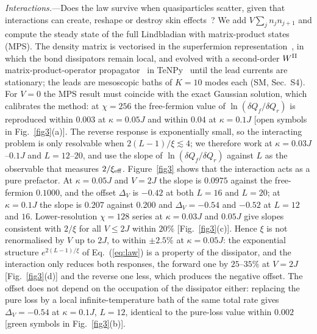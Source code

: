 \documentclass[reprint,aps,prl,superscriptaddress,nofootinbib,floatfix]{revtex4-2}
\newcommand{\dQ}{\delta Q}
\begin{document}
\textit{Interactions.}---Does the law survive when quasiparticles scatter, given that interactions can create, reshape or destroy skin effects~\cite{Brighi2024,Koh2026,Roccati2026}? We add $V\sum_j n_jn_{j+1}$ and compute the steady state of the full Lindbladian with matrix-product states (MPS). The density matrix is vectorised in the superfermion representation~\cite{Prosen2008,Dzhioev2011}, in which the bond dissipators remain local, and evolved with a second-order $W^{\rm II}$ matrix-product-operator propagator~\cite{Zaletel2015} in TeNPy~\cite{Hauschild2018} until the lead currents are stationary; the leads are mesoscopic baths of $K=10$ modes each (SM, Sec.~S4). For $V=0$ the MPS result must coincide with the exact Gaussian solution, which calibrates the method: at $\chi=256$ the free-fermion value of $\ln(\dQ_f/\dQ_r)$ is reproduced within $0.003$ at $\kappa=0.05J$ and within $0.04$ at $\kappa=0.1J$ [open symbols in Fig.~\ref{fig3}(a)].
The reverse response is exponentially small, so the interacting problem is only resolvable when $2(L-1)/\xi\lesssim4$; we therefore work at $\kappa=0.03J$--$0.1J$ and $L=12$--$20$, and use the slope of $\ln(\dQ_f/\dQ_r)$ against $L$ as the observable that measures $2/\xi_{\rm eff}$.
Figure~\ref{fig3} shows that the interaction acts as a pure prefactor. At $\kappa=0.05J$ and $V=2J$ the slope is $0.0975$ against the free-fermion $0.1000$, and the offset $\Delta_V$ is $-0.42$ at both $L=16$ and $L=20$; at $\kappa=0.1J$ the slope is $0.207$ against $0.200$ and $\Delta_V=-0.54$ and $-0.52$ at $L=12$ and $16$. Lower-resolution $\chi=128$ series at $\kappa=0.03J$ and $0.05J$ give slopes consistent with $2/\xi$ for all $V\le2J$ within $20\%$ [Fig.~\ref{fig3}(c)].
Hence $\xi$ is not renormalised by $V$ up to $2J$, to within $\pm2.5\%$ at $\kappa=0.05J$: the exponential structure $e^{2(L-1)/\xi}$ of Eq.~(\ref{eq:law}) is a property of the dissipator, and the interaction only reduces both responses, the forward one by $25$--$35\%$ at $V=2J$ [Fig.~\ref{fig3}(d)] and the reverse one less, which produces the negative offset.
The offset does not depend on the occupation of the dissipator either: replacing the pure loss by a local infinite-temperature bath of the same total rate gives $\Delta_V=-0.54$ at $\kappa=0.1J$, $L=12$, identical to the pure-loss value within $0.002$ [green symbols in Fig.~\ref{fig3}(b)].
\end{document}
